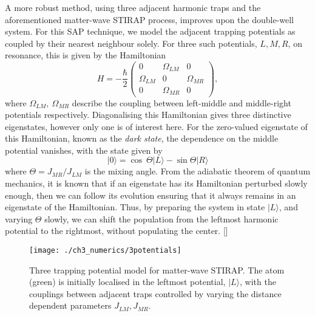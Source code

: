 A more robust method, using three adjacent harmonic traps and the aforementioned matter-wave STIRAP process, improves upon the double-well system. For this SAP technique, we model the adjacent trapping potentials as coupled by their nearest neighbour solely. For three such potentials, $L,M,R$, on resonance,  this is given by the Hamiltonian
\begin{equation}\label{eqn:sap_ham}
    H = -\frac{\hbar}{2}
    \begin{pmatrix}
        0 & \Omega_{LM} & 0 \\
        \Omega_{LM} & 0 & \Omega_{MR} \\
        0 & \Omega_{MR} & 0
    \end{pmatrix},
\end{equation}
where $\Omega_{LM},~\Omega_{MR}$ describe the coupling between left-middle and middle-right potentials respectively. Diagonalising this Hamiltonian gives three distinctive eigenstates, however only one is of interest here. For the zero-valued eigenstate of this Hamiltonian, known as the \textit{dark state}, the dependence on the middle potential vanishes, with the state given by
\begin{equation}
 | 0 \rangle = \cos\ \Theta| L \rangle - \sin \Theta | R \rangle
\end{equation}
where $\Theta=J_{MR}/J_{LM}$ is the mixing angle. From the adiabatic theorem of quantum mechanics, it is known that if an eigenstate has its Hamiltonian perturbed slowly enough, then we can follow its evolution ensuring that it always remains in an eigenstate of the Hamiltonian. Thus, by preparing the system in state $| L \rangle$, and varying $\Theta$ slowly, we can shift the population from the leftmost harmonic potential to the rightmost, without populating the center. []

\begin{figure}
    \centering
    \texttt{[image: ./ch3\_numerics/3potentials]}
    \caption{Three trapping potential model for matter-wave STIRAP. The atom (green) is initially localised in the leftmost potential, $|L\rangle$, with the couplings between adjacent traps controlled by varying the distance dependent parameters $J_{LM},J_{MR}$.}
    \label{fig:ch3_stirap}
\end{figure}

